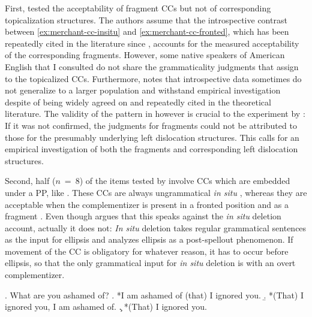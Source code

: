 First, \citet{merchant.etal2013} tested the acceptability of fragment CCs but not of corresponding topicalization structures. The authors assume that the introspective contrast between \ref{ex:merchant-cc-insitu} and \ref{ex:merchant-cc-fronted}, which has been repeatedly cited in the literature since \citet{stowell1981}, accounts for the measured acceptability of the corresponding fragments. However, some native speakers of American English that I consulted do not share the grammaticality judgments that \citet{merchant.etal2013} assign to the topicalized CCs. Furthermore, \citet{featherston2007} notes that introspective data sometimes do not generalize to a larger population and withstand empirical investigation despite of being widely agreed on and repeatedly cited in the theoretical literature. The validity of the pattern in \LLast however is crucial to the experiment by \citet{merchant.etal2013}: If it was not confirmed, the judgments for fragments could not be attributed to those for the presumably underlying left dislocation structures. This calls for an empirical investigation of both the fragments and corresponding left dislocation structures.

Second, half ($n$~=~8) of the items tested by \citet{merchant.etal2013} involve CCs which are embedded under a PP, like \Next. These CCs are always ungrammatical \textit{in situ} \Next[a], whereas they are acceptable when the complementizer is present in a fronted position \Next[b] and as a fragment \Next[c]. Even though \citet{merchant2004} argues that this speaks against the \textit{in situ} deletion account, actually it does not: \textit{In situ} deletion takes regular grammatical sentences as the input for ellipsis and analyzes ellipsis as a post-spellout phenomenon. If movement of the CC is obligatory for whatever reason, it has to occur before ellipsis, so that the only grammatical input for \textit{in situ} deletion is \Next[b] with an overt complementizer.

\ex. What are you ashamed of?
\a. *I am ashamed of (that) I ignored you.
\b. *(That) I ignored you, I am ashamed of.
\c. *(That) I ignored you.

